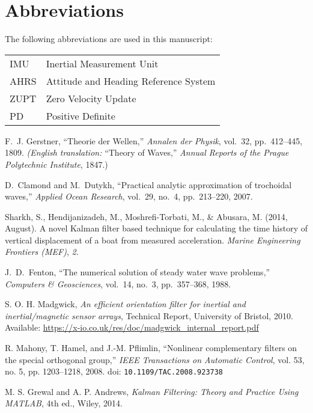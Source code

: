 \documentclass[11pt,letterpaper]{article}
\begin{document}
\section*{Abbreviations}
The following abbreviations are used in this manuscript:

\begin{tabular}{ll}
IMU & Inertial Measurement Unit \\
AHRS & Attitude and Heading Reference System \\
ZUPT & Zero Velocity Update \\
PD & Positive Definite \\
\end{tabular}

\begin{thebibliography}{20}

F.~J. Gerstner, ``Theorie der Wellen,'' 
\emph{Annalen der Physik}, vol.~32, pp.~412–445, 1809.  
\emph{(English translation: }``Theory of Waves,'' \emph{Annual Reports of the Prague Polytechnic Institute}, 1847.)

D.~Clamond and M.~Dutykh, ``Practical analytic approximation of trochoidal waves,'' 
\emph{Applied Ocean Research}, vol.~29, no.~4, pp.~213–220, 2007.

Sharkh, S., Hendijanizadeh, M., Moshrefi-Torbati, M., \& Abusara, M. (2014, August). 
A novel Kalman filter based technique for calculating the time history of vertical displacement of a boat from measured acceleration. 
\textit{Marine Engineering Frontiers (MEF)}, \textit{2}.

J.~D.~Fenton, “The numerical solution of steady water wave problems,” \emph{Computers \& Geosciences}, vol.~14, no.~3, pp.~357–368, 1988.

S. O. H. Madgwick,  
\textit{An efficient orientation filter for inertial and inertial/magnetic sensor arrays},  
Technical Report, University of Bristol, 2010.  
Available: \url{https://x-io.co.uk/res/doc/madgwick_internal_report.pdf}

R. Mahony, T. Hamel, and J.-M. Pflimlin,  
``Nonlinear complementary filters on the special orthogonal group,''  
\textit{IEEE Transactions on Automatic Control}, vol. 53, no. 5, pp. 1203--1218, 2008.  
doi: \texttt{10.1109/TAC.2008.923738}

M. S. Grewal and A. P. Andrews,  
\textit{Kalman Filtering: Theory and Practice Using MATLAB},  
4th ed., Wiley, 2014.


\end{thebibliography}
\end{document}
